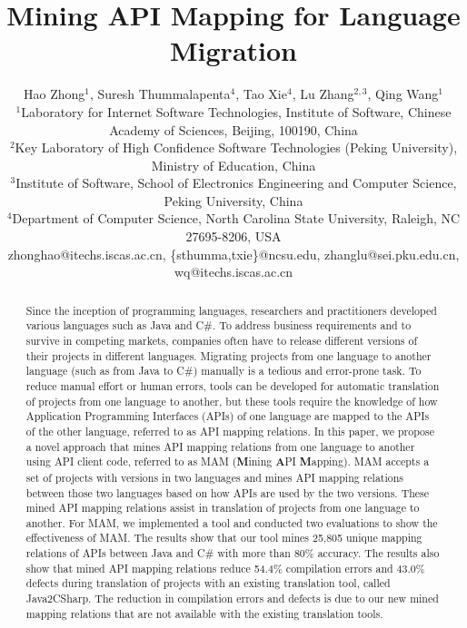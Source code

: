 \documentclass{sig-alternate}
\begin{document}

\title{Mining API Mapping for Language Migration}

\author{
Hao Zhong$^{1}$, Suresh Thummalapenta$^4$, Tao Xie$^4$, Lu Zhang$^{2,3}$, Qing Wang$^{1}$\\
\small{$^1$Laboratory for Internet Software Technologies, Institute of Software, Chinese Academy of Sciences, Beijing, 100190, China}\\
\small{$^2$Key Laboratory of High Confidence Software Technologies (Peking University), Ministry of Education, China}\\
\small{$^3$Institute of Software, School of Electronics Engineering and Computer Science, Peking University, China} \\
\small{$^4$Department of Computer Science, North Carolina State University, Raleigh, NC 27695-8206, USA}\\
\small{zhonghao@itechs.iscas.ac.cn, \{sthumma,txie\}@ncsu.edu,
zhanglu@sei.pku.edu.cn, wq@itechs.iscas.ac.cn}}

\maketitle
\thispagestyle{empty}

\begin{abstract}
Since the inception of programming languages, researchers and
practitioners developed various languages such as Java and C\#. To
address business requirements and to survive in competing markets,
companies often have to release different versions of their projects
in different languages. Migrating projects from one language to
another language (such as from Java to C\#) manually is a tedious
and error-prone task. To reduce manual effort or human errors, tools
can be developed for automatic translation of projects from one
language to another, but these tools require the knowledge of how
Application Programming Interfaces (APIs) of one language are mapped
to the APIs of the other language, referred to as API mapping
relations. In this paper, we propose a novel approach that mines API
mapping relations from one language to another using API client
code, referred to as MAM (\textbf{M}ining \textbf{A}PI
\textbf{M}apping). MAM accepts a set of projects with versions in
two languages and mines API mapping relations between those two
languages based on how APIs are used by the two versions. These
mined API mapping relations assist in translation of projects from
one language to another. For MAM, we implemented a tool and
conducted two evaluations to show the effectiveness of MAM. The
results show that our tool mines 25,805 unique mapping relations of
APIs between Java and C\# with more than 80\% accuracy. The results
also show that mined API mapping relations reduce 54.4\% compilation
errors and 43.0\% defects during translation of projects with an
existing translation tool, called Java2CSharp. The reduction in
compilation errors and defects is due to our new mined mapping
relations that are not available with the existing translation
tools.
\end{abstract}
\end{document}

